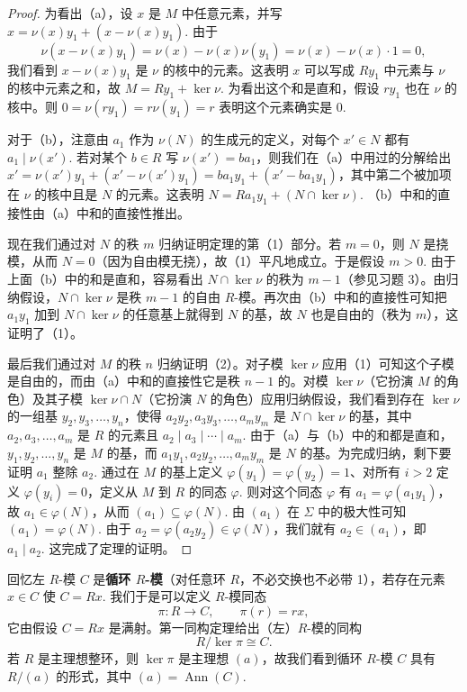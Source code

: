 \begin{proof}
为看出（a），设 \(x\) 是 \(M\) 中任意元素，并写 \(x = \nu(x)y_1+(x-\nu(x)y_1)\). 由于
\[
\nu(x-\nu(x)y_1) = \nu(x)-\nu(x)\nu(y_1) = \nu(x)-\nu(x) \cdot 1 = 0,
\]
我们看到 \(x-\nu(x)y_1\) 是 \(\nu\) 的核中的元素。这表明 \(x\) 可以写成 \(Ry_1\) 中元素与 \(\nu\) 的核中元素之和，故 \(M = Ry_1+\ker\nu\). 为看出这个和是直和，假设 \(ry_1\) 也在 \(\nu\) 的核中。则 \(0 = \nu(ry_1) = r\nu(y_1) = r\) 表明这个元素确实是 0.

对于（b），注意由 \(a_1\) 作为 \(\nu(N)\) 的生成元的定义，对每个 \(x' \in N\) 都有 \(a_1 \mid \nu(x')\). 若对某个 \(b \in R\) 写 \(\nu(x') = ba_1\)，则我们在（a）中用过的分解给出 \(x' = \nu(x')y_1+(x'-\nu(x')y_1) = ba_1y_1+(x'-ba_1y_1)\)，其中第二个被加项在 \(\nu\) 的核中且是 \(N\) 的元素。这表明 \(N = Ra_1y_1+(N \cap \ker\nu)\). （b）中和的直接性由（a）中和的直接性推出。

现在我们通过对 \(N\) 的秩 \(m\) 归纳证明定理的第（1）部分。若 \(m = 0\)，则 \(N\) 是挠模，从而 \(N = 0\)（因为自由模无挠），故（1）平凡地成立。于是假设 \(m > 0\). 由于上面（b）中的和是直和，容易看出 \(N \cap \ker\nu\) 的秩为 \(m-1\)（参见习题 3）。由归纳假设，\(N \cap \ker\nu\) 是秩 \(m-1\) 的自由 \(R\)-模。再次由（b）中和的直接性可知把 \(a_1y_1\) 加到 \(N \cap \ker\nu\) 的任意基上就得到 \(N\) 的基，故 \(N\) 也是自由的（秩为 \(m\)），这证明了（1）。

最后我们通过对 \(M\) 的秩 \(n\) 归纳证明（2）。对子模 \(\ker\nu\) 应用（1）可知这个子模是自由的，而由（a）中和的直接性它是秩 \(n-1\) 的。对模 \(\ker\nu\)（它扮演 \(M\) 的角色）及其子模 \(\ker\nu \cap N\)（它扮演 \(N\) 的角色）应用归纳假设，我们看到存在 \(\ker\nu\) 的一组基 \(y_2, y_3, \ldots, y_n\)，使得 \(a_2y_2, a_3y_3, \ldots, a_my_m\) 是 \(N \cap \ker\nu\) 的基，其中 \(a_2, a_3, \ldots, a_m\) 是 \(R\) 的元素且 \(a_2 \mid a_3 \mid \cdots \mid a_m\). 由于（a）与（b）中的和都是直和，\(y_1, y_2, \ldots, y_n\) 是 \(M\) 的基，而 \(a_1y_1, a_2y_2, \ldots, a_my_m\) 是 \(N\) 的基。为完成归纳，剩下要证明 \(a_1\) 整除 \(a_2\). 通过在 \(M\) 的基上定义 \(\varphi(y_1) = \varphi(y_2) = 1\)、对所有 \(i > 2\) 定义 \(\varphi(y_i) = 0\)，定义从 \(M\) 到 \(R\) 的同态 \(\varphi\). 则对这个同态 \(\varphi\) 有 \(a_1 = \varphi(a_1y_1)\)，故 \(a_1 \in \varphi(N)\)，从而 \((a_1) \subseteq \varphi(N)\). 由 \((a_1)\) 在 \(\Sigma\) 中的极大性可知 \((a_1) = \varphi(N)\). 由于 \(a_2 = \varphi(a_2y_2) \in \varphi(N)\)，我们就有 \(a_2 \in (a_1)\)，即 \(a_1 \mid a_2\). 这完成了定理的证明。
\end{proof}

回忆左 \(R\)-模 \(C\) 是\textbf{循环 \(R\)-模}（对任意环 \(R\)，不必交换也不必带 1），若存在元素 \(x \in C\) 使 \(C = Rx\). 我们于是可以定义 \(R\)-模同态
\[
\pi : R \longrightarrow C, \qquad \pi(r) = rx,
\]
它由假设 \(C = Rx\) 是满射。第一同构定理给出（左）\(R\)-模的同构
\[
R/\ker\pi \cong C.
\]
若 \(R\) 是主理想整环，则 \(\ker\pi\) 是主理想 \((a)\)，故我们看到循环 \(R\)-模 \(C\) 具有 \(R/(a)\) 的形式，其中 \((a) = \operatorname{Ann}(C)\).

